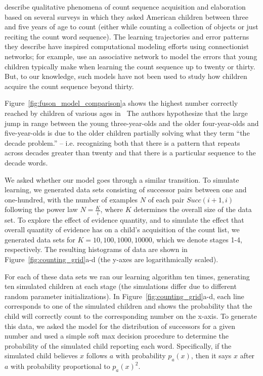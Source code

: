 \documentclass[10pt,letterpaper]{article}
\begin{document}
\cite{FusRicBriar1982} describe qualitative phenomena of count
sequence acquisition and elaboration based on several surveys in which
they asked American children between three and five years of age to
count (either while counting a collection of objects or just reciting
the count word sequence). The learning trajectories and error patterns
they describe have inspired computational modeling efforts using
connectionist networks; for example, \citet{ma1989modeling} use an
associative network to model the errors that young children typically
make when learning the count sequence up to twenty or thirty. But, to
our knowledge, such models have not been used to study how children
acquire the count sequence beyond thirty.

Figure~\ref{fig:fuson_model_comparison}a shows the highest number
correctly reached by children of various ages
in~\citeauthor{FusRicBriar1982} The authors hypothesize that the large
jump in range between the young three-year-olds and the older
four-year-olds and five-year-olds is due to the older children
partially solving what they term ``the decade problem.'' --  i.e.
recognizing both that there is a pattern that repeats across decades
greater than twenty and that there is a particular sequence to the
decade words.

We asked whether our model goes through a similar transition. To
simulate learning, we generated data sets consisting of successor
pairs between one and one-hundred, with the number of examples $N$ of each
pair $Succ(i+1, i)$ following the power law $N=\frac{K}{i}$, where $K$
determines the overall size of the data set. To explore the effect of
evidence quantity, and to simulate the effect that overall quantity
of evidence has on a child's acquisition of the count list, we
generated data sets for $K=10, 100, 1000, 10000$, which we denote
stages 1-4, respectively. The resulting histograms of data are shown in
Figure~\ref{fig:counting_grid}a-d (the y-axes are logarithmically
scaled).

For each of these data sets we ran our learning algorithm ten times,
generating ten simulated children at each stage (the simulations
differ due to different random parameter initializations). In
Figure~\ref{fig:counting_grid}a-d, each line corresponds to one of the
simulated children and shows the probability that the child will
correctly count to the corresponding number on the x-axis. To generate
this data, we asked the model for the distribution of successors for a
given number and used a simple soft max decision procedure to
determine the probability of the simulated child reporting each word.
Specifically, if the simulated child believes $x$ follows $a$
with probability $p_a(x)$, then it says $x$ after $a$ with probability
proportional to $p_a(x)^2 $.
\end{document}
